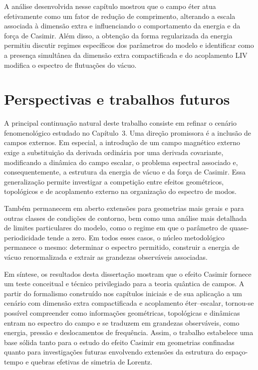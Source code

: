 A análise desenvolvida nesse capítulo mostrou que o campo éter atua efetivamente como um fator de redução de comprimento, alterando a escala associada à dimensão extra e influenciando o comportamento da energia e da força de Casimir. Além disso, a obtenção da forma regularizada da energia permitiu discutir regimes específicos dos parâmetros do modelo e identificar como a presença simultânea da dimensão extra compactificada e do acoplamento LIV modifica o espectro de flutuações do vácuo.

\section{Perspectivas e trabalhos futuros}
\label{sec:perspectivas}

A principal continuação natural deste trabalho consiste em refinar o cenário fenomenológico estudado no Capítulo~3. Uma direção promissora é a inclusão de campos externos. Em especial, a introdução de um campo magnético externo exige a substituição da derivada ordinária por uma derivada covariante, modificando a dinâmica do campo escalar, o problema espectral associado e, consequentemente, a estrutura da energia de vácuo e da força de Casimir. Essa generalização permite investigar a competição entre efeitos geométricos, topológicos e de acoplamento externo na organização do espectro de modos.

Também permanecem em aberto extensões para geometrias mais gerais e para outras classes de condições de contorno, bem como uma análise mais detalhada de limites particulares do modelo, como o regime em que o parâmetro de quase-periodicidade tende a zero. Em todos esses casos, o núcleo metodológico permanece o mesmo: determinar o espectro permitido, construir a energia de vácuo renormalizada e extrair as grandezas observáveis associadas.

Em síntese, os resultados desta dissertação mostram que o efeito Casimir fornece um teste conceitual e técnico privilegiado para a teoria quântica de campos. A partir do formalismo construído nos capítulos iniciais e de sua aplicação a um cenário com dimensão extra compactificada e acoplamento éter--escalar, tornou-se possível compreender como informações geométricas, topológicas e dinâmicas entram no espectro do campo e se traduzem em grandezas observáveis, como energia, pressão e deslocamentos de frequência. Assim, o trabalho estabelece uma base sólida tanto para o estudo do efeito Casimir em geometrias confinadas quanto para investigações futuras envolvendo extensões da estrutura do espaço-tempo e quebras efetivas de simetria de Lorentz.
